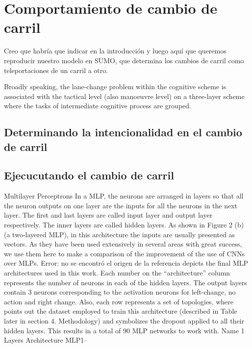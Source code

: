 \chapter{Comportamiento de cambio de carril}
\label{ch:lane-change-submodel}

\TODO Creo que habría que indicar en la introducción y luego aquí que queremos reproducir nuestro modelo en SUMO, que determina los cambios de carril como teleportaciones de un carril a otro.

Broadly speaking, the lane-change problem within the cognitive scheme is associated with the tactical level (also manoeuvre level) on a three-layer scheme where the tasks of intermediate cognitive process are grouped.



\section{Determinando la intencionalidad en el cambio de carril}
\label{s:lane-change-intention}

\section{Ejecucutando el cambio de carril}
\label{s:lane-change-execution}

Multilayer Perceptrons
In a MLP, the neurons are arranged in layers so that all the neuron outputs on one layer are the inputs for all the neurons in the next layer. The first and last layers are called input layer and output layer respectively. The inner layers are called hidden layers. As shown in Figure 2 (b) (a two-layered MLP), in this architecture the inputs are usually presented as vectors.
As they have been used extensively in several areas with great success, we use them here to make a comparison of the improvement of the use of CNNs over MLPs.
Error: no se encontró el origen de la referencia depicts the final MLP architectures used in this work. Each number on the “architecture” column represents the number of neurons in each of the hidden layers. The output layers contain 3 neurons corresponding to the activation neurons for left-change, no action and right change. Also, each row represents a set of topologies, where  points out the dataset employed to train this architecture (described in Table  later in section 4. Methodology) and  symbolizes the dropout applied to all their hidden layers. This results in a total of 90 MLP networks to work with.
Name 1
Layers
Architecture
MLP1--



